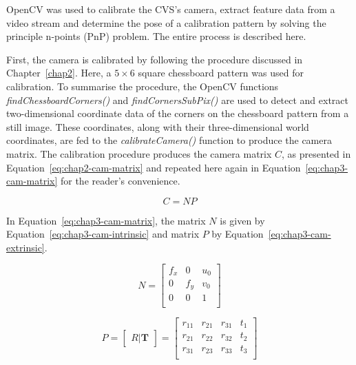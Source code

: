 OpenCV was used to calibrate the CVS's camera, extract feature data from a video stream and determine the pose of a calibration pattern by solving the principle n-points (PnP) problem. The entire process is described here. 

First, the camera is calibrated by following the procedure discussed in Chapter~\ref{chap2}. Here, a $5\times6$ square chessboard pattern was used for calibration. To summarise the procedure, the OpenCV functions \emph{findChessboardCorners()} and \emph{findCornersSubPix()} are used to detect and extract two-dimensional coordinate data of the corners on the chessboard pattern from a still image. These coordinates, along with their three-dimensional world coordinates, are fed to the \emph{calibrateCamera()} function to produce the camera matrix. The calibration procedure produces the camera matrix $C$, as presented in Equation~\ref{eq:chap2-cam-matrix} and repeated here again in Equation~\ref{eq:chap3-cam-matrix} for the reader's convenience. 

\begin{equation}
  \label{eq:chap3-cam-matrix}
  C = 
  NP
\end{equation}

In Equation~\ref{eq:chap3-cam-matrix}, the matrix $N$ is given by Equation~\ref{eq:chap3-cam-intrinsic} and matrix $P$ by Equation~\ref{eq:chap3-cam-extrinsic}.

\begin{equation}
  \label{eq:chap3-cam-intrinsic}
  N = 
  \begin{bmatrix}
    f_x & 0   & u_0 \\
    0   & f_y & v_0 \\
    0   & 0   & 1   \\
  \end{bmatrix}
\end{equation}

\begin{equation}
  \label{eq:chap3-cam-extrinsic}
  P = 
  \begin{bmatrix}
    R | \bm{T}
  \end{bmatrix}
  =
  \begin{bmatrix}
    r_{11} & r_{21} & r_{31} & t_1 \\
    r_{21} & r_{22} & r_{32} & t_2 \\
    r_{31} & r_{23} & r_{33} & t_3 \\
  \end{bmatrix}
\end{equation}

